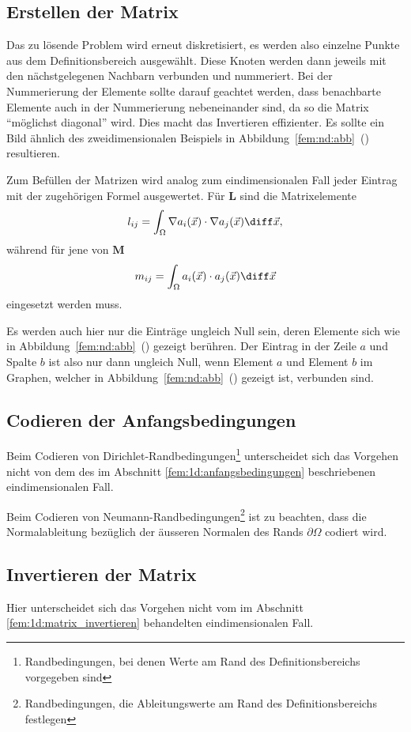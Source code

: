 \subsection{Erstellen der Matrix}
Das zu lösende Problem wird erneut diskretisiert, es werden also einzelne Punkte aus dem Definitionsbereich ausgewählt.
Diese Knoten werden dann jeweils mit den nächstgelegenen Nachbarn verbunden und nummeriert.
Bei der Nummerierung der Elemente sollte darauf geachtet werden, dass benachbarte Elemente auch in der Nummerierung nebeneinander sind, da so die Matrix ``möglichst diagonal'' wird.
Dies macht das Invertieren effizienter.
Es sollte ein Bild ähnlich des zweidimensionalen Beispiels in Abbildung~\ref{fem:nd:abb}~()
resultieren.

Zum Befüllen der Matrizen wird analog zum eindimensionalen Fall jeder Eintrag mit der zugehörigen Formel ausgewertet.
Für $\mathbf{L}$ sind die Matrixelemente
\begin{equation}
    l_{ij} = \int_{\Omega} \nabla a_i(\vec{x}) \cdot \nabla a_j(\vec{x}) \diff \vec{x},
\end{equation}
während für jene von $\mathbf{M}$ 
\begin{equation}
    m_{ij} = \int_{\Omega} a_i(\vec{x}) \cdot a_j(\vec{x}) \diff \vec{x}
\end{equation}
eingesetzt werden muss.

Es werden auch hier nur die Einträge ungleich Null sein, deren Elemente sich wie in Abbildung~\ref{fem:nd:abb}~() gezeigt berühren.
Der Eintrag in der Zeile $a$ und Spalte $b$ ist also nur dann ungleich Null, wenn Element $a$ und Element $b$ im Graphen, welcher in Abbildung~\ref{fem:nd:abb}~() gezeigt ist, verbunden sind.

\subsection{Codieren der Anfangsbedingungen}
Beim Codieren von Dirichlet-Randbedingungen\footnote{Randbedingungen, bei denen Werte am Rand des Definitionsbereichs vorgegeben sind}
unterscheidet sich das Vorgehen nicht von dem des im Abschnitt \ref{fem:1d:anfangsbedingungen} beschriebenen eindimensionalen Fall. 

Beim Codieren von Neumann-Randbedingungen\footnote{Randbedingungen, die Ableitungswerte am Rand des Definitionsbereichs festlegen}
ist zu beachten, dass die Normalableitung bezüglich der äusseren Normalen des Rands $\partial \Omega$ codiert wird.

\subsection{Invertieren der Matrix}
Hier unterscheidet sich das Vorgehen nicht vom im Abschnitt \ref{fem:1d:matrix_invertieren} behandelten eindimensionalen Fall.